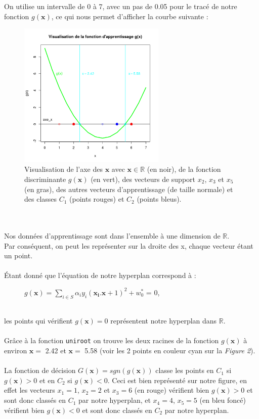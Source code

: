 \documentclass[a4paper, 10pt]{article}
\begin{document}
\newpage
\noindent
On utilise un intervalle de 0 à 7, avec un pas de 0.05 pour le tracé de notre fonction $g(\mathbf{x})$, ce qui nous permet d'afficher la courbe suivante :
\begin{figure}[h!]
\centering
\includegraphics[height = 7cm, width = 7cm]{plots/ex3_graphe.png}
\caption{Visualisation de l'axe des $\mathbf{x}$ avec $\mathbf{x} \in \mathbb{R}$ (en noir), de la fonction discriminante $g(\mathbf{x})$ (en vert), des vecteurs de support $x_{2}$, $x_{3}$ et $x_{5}$  (en gras), des autres vecteurs d'apprentissage (de taille normale) et des classes $C_{1}$ (points rouges) et $C_{2}$ (points bleus).}
\end{figure}\\ \\
Nos données d'apprentissage sont dans l'ensemble à une dimension de $\mathbb{R}$.\\
Par conséquent, on peut les représenter sur la droite des x, chaque vecteur étant un point.\\ \\
Étant donné que l'équation de notre hyperplan correspond à :
\begin{figure}[h!]
\centering
 $g(\mathbf{x}) =  \sum_{i \in S}\alpha_{i}y_{i}(\mathbf{x_{i}}.\mathbf{x} + 1)^{2} +w_{0}^{*}$ = 0, 
\end{figure}\\
les points qui vérifient $g(\mathbf{x}) = 0$ représentent notre hyperplan dans $\mathbb{R}$.\\ \\
Grâce à la fonction \texttt{uniroot} on trouve les deux racines de la fonction $g(\mathbf{x})$ à environ $\mathbf{x} =$ 2.42 et  $\mathbf{x} =$ 5.58 (voir les 2 points en couleur cyan sur la \textit{Figure 2}).\\ \\
La fonction de décision $G(\mathbf{x}) = sgn(g(\mathbf{x}))$ classe les points en $C_{1}$ si  $g(\mathbf{x}) > 0$ et en  $C_{2}$ si  $g(\mathbf{x}) < 0$. Ceci est bien représenté sur notre figure, en effet les vecteurs  $x_{1} = 1$, $x_{2} = 2$ et $x_{3} = 6$ (en rouge) vérifient bien $g(\mathbf{x}) > 0$ et sont donc classés en $C_{1}$ par notre hyperplan, et $x_{4} = 4$, $x_{5} = 5$ (en bleu foncé) vérifient bien $g(\mathbf{x}) < 0$ et sont donc classés en $C_{2}$ par notre hyperplan.\\
\end{document}
